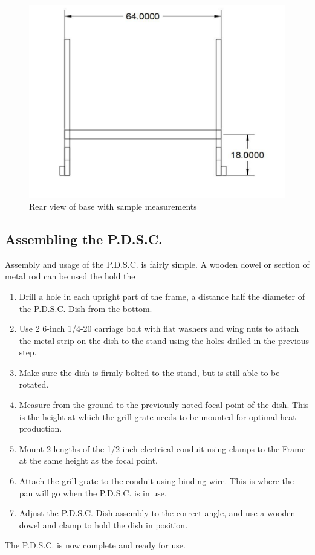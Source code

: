 \documentclass{article}
\begin{document}
\begin{figure}[!htb]
                  \includegraphics[width=\linewidth]{base_rear}
                  \caption{Rear view of base with sample measurements}\label{fig:awesome_image3}
                \endminipage
                
                \end{figure}
        \subsection{Assembling the P.D.S.C.}
            Assembly and usage of the P.D.S.C. is fairly simple. A wooden dowel or section of metal rod can be used the hold the 
            \begin{enumerate}
                \item Drill a hole in each upright part of the frame, a distance half the diameter of the P.D.S.C. Dish from the bottom.
                \item Use 2 6-inch 1/4-20 carriage bolt with flat washers and wing nuts to attach the metal strip on the dish to the stand using the holes drilled in the previous step.
                \item Make sure the dish is firmly bolted to the stand, but is still able to be rotated.
                \item Measure from the ground to the previously noted focal point of the dish.  This is the height at which the grill grate needs to be mounted for optimal heat production.
                \item Mount 2 lengths of the 1/2 inch electrical conduit using clamps to the Frame at the same height as the focal point.
                \item Attach the grill grate to the conduit using binding wire.  This is where the pan will go when the P.D.S.C. is in use.
                \item Adjust the P.D.S.C. Dish assembly to the correct angle, and use a wooden dowel and clamp to hold the dish in position.
            \end{enumerate}
            The P.D.S.C. is now complete and ready for use.
    \newpage
\end{document}

